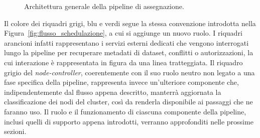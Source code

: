 \begin{figure}[htb]
    \caption{Architettura generale della pipeline di assegnazione.}
    \label{fig:architettura_generale}
\end{figure}

Il colore dei riquadri grigi, blu e verdi segue la stessa convenzione introdotta nella Figura~\ref{fig:flusso_schedulazione}, a cui si aggiunge un nuovo ruolo. I riquadri arancioni infatti rappresentano i servizi esterni dedicati che vengono interrogati lungo la pipeline per recuperare metadati di dataset, conflitti o autorizzazioni, la cui interazione è rappresentata in figura da una linea tratteggiata. Il riquadro grigio del \emph{node-controller}, coerentemente con il suo ruolo neutro non legato a una fase specifica della pipeline, rappresenta invece un'ulteriore componente che, indipendentemente dal flusso appena descritto, manterrà aggiornata la classificazione dei nodi del cluster, così da renderla disponibile ai passaggi che ne faranno uso. Il ruolo e il funzionamento di ciascuna componente della pipeline, inclusi quelli di supporto appena introdotti, verranno approfonditi nelle prossime sezioni.


